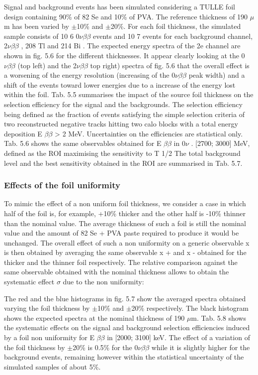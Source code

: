 \documentclass[main.tex]{subfiles}
\begin{document}
\NI Signal and background events has been simulated considering a TULLE foil design containing 90\% of 82 Se and 10\% of PVA. The reference thickness of 190 $\mu$m has been varied by $\pm$10\% and $\pm$20\%. For each foil thickness, the simulated sample consists of 10 6 0$\nu\beta\beta$ events and 10 7 events for each background channel, 2$\nu\beta\beta$ , 208 Tl and 214 Bi . The expected energy spectra of the 2e  channel are shown in fig. 5.6 for the different thicknesses. It appear clearly looking at the 0$\nu\beta\beta$ (top left) and the 2$\nu\beta\beta$ top right) spectra of fig. 5.6 that the overall effect is a worsening of the energy resolution (increasing of the 0$\nu\beta\beta$ peak width) and a shift of the events toward lower energies due to a increase of the energy lost within the foil. Tab. 5.5 summarises the impact of the source foil thickness on the selection efficiency for the signal and the backgrounds. The selection efficiency being defined as the fraction of events satisfying the simple selection criteria of two reconstructed negative tracks hitting two calo blocks with a total energy deposition E $\beta\beta$ > 2 MeV. Uncertainties on the efficiencies are statistical only. Tab. 5.6 shows the same observables obtained for E $\beta\beta$ in 0$\nu$ . [2700; 3000] MeV, defined as the ROI maximising the sensitivity to T 1/2 The total background level and the best sensitivity obtained in the ROI are summarised in Tab. 5.7.


\subsubsection{Effects of the foil uniformity}


\NI To mimic the effect of a non uniform foil thickness, we consider a case in which half of the foil is, for example, +10\% thicker and the other half is -10\% thinner than the nominal value. The average thickness of such a foil is still the nominal value and the amount of 82 Se + PVA paste required to produce it would be unchanged. The overall effect of such a non uniformity on a generic observable x is then obtained by averaging the same observable x + and x - obtained for the thicker and the thinner foil respectively. The relative comparison against the same observable obtained with the nominal thickness allows to obtain the systematic effect $\sigma$ due to the non uniformity:


\bigskip


\NI The red and the blue histograms in fig. 5.7 show the averaged spectra obtained varying the foil thickness by $\pm$10\% and $\pm$20\% respectively. The black histogram shows the expected spectra at the nominal thickness of 190 $\mu$m. Tab. 5.8 shows the systematic effects on the signal and background selection efficiencies induced by a foil non uniformity for E $\beta\beta$ in [2000; 3100] keV. The effect of a variation of the foil thickness by $\pm$20\% is 0.5\% for the 0$\nu\beta\beta$ while it is slightly higher for the background events, remaining however within the statistical uncertainty of the simulated samples of about 5\%.
\end{document}
